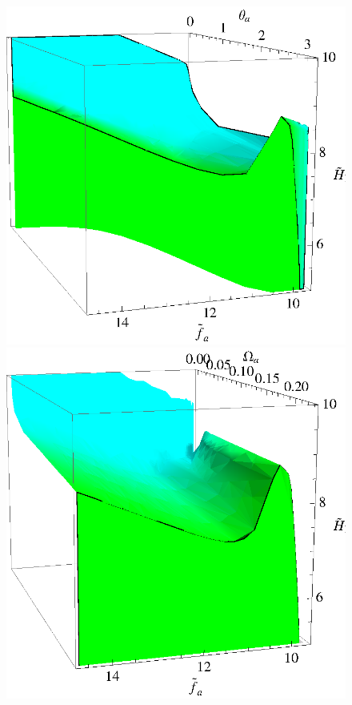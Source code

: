 \documentclass[preprint,nofootinbib]{revtex4}
\begin{document}
\begin{figure}[tbp]
\begin{center}
\includegraphics[width=0.6\figwidth]{Anthropic3D_1}
\includegraphics[width=0.6\figwidth]{Anthropic3D_2}

\end{center}
\end{figure}
\end{document}
